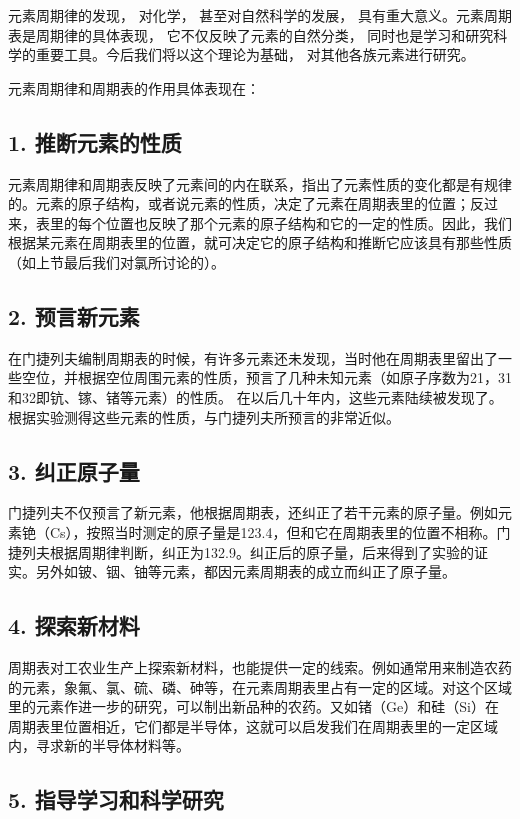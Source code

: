 元素周期律的发现， 对化学， 甚至对自然科学的发展，
具有重大意义。元素周期表是周期律的具体表现，
它不仅反映了元素的自然分类，
同时也是学习和研究科学的重要工具。今后我们将以这个理论为基础，
对其他各族元素进行研究。

元素周期律和周期表的作用具体表现在：

\subsection{1. 推断元素的性质}

元素周期律和周期表反映了元素间的内在联系，指出了元素性质的变化都是有规律的。元素的原子结构，或者说元素的性质，决定了元素在周期表里的位置；反过来，表里的每个位置也反映了那个元素的原子结构和它的一定的性质。因此，我们根据某元素在周期表里的位置，就可决定它的原子结构和推断它应该具有那些性质（如上节最后我们对氯所讨论的）。

\subsection{2. 预言新元素}

在门捷列夫编制周期表的时候，有许多元素还未发现，当时他在周期表里留出了一些空位，并根据空位周围元素的性质，预言了几种未知元素（如原子序数为21，31和32即钪、镓、锗等元素）的性质。
在以后几十年内，这些元素陆续被发现了。
根据实验测得这些元素的性质，与门捷列夫所预言的非常近似。

\subsection{3. 纠正原子量}

门捷列夫不仅预言了新元素，他根据周期表，还纠正了若干元素的原子量。例如元素铯（Cs），按照当时测定的原子量是123.4，但和它在周期表里的位置不相称。门捷列夫根据周期律判断，纠正为132.9。纠正后的原子量，后来得到了实验的证实。另外如铍、铟、铀等元素，都因元素周期表的成立而纠正了原子量。

\subsection{4. 探索新材料}

周期表对工农业生产上探索新材料，也能提供一定的线索。例如通常用来制造农药的元素，象氟、氯、硫、磷、砷等，在元素周期表里占有一定的区域。对这个区域里的元素作进一步的研究，可以制出新品种的农药。又如锗（Ge）和硅（Si）在周期表里位置相近，它们都是半导体，这就可以启发我们在周期表里的一定区域内，寻求新的半导体材料等。

\subsection{5. 指导学习和科学研究}

